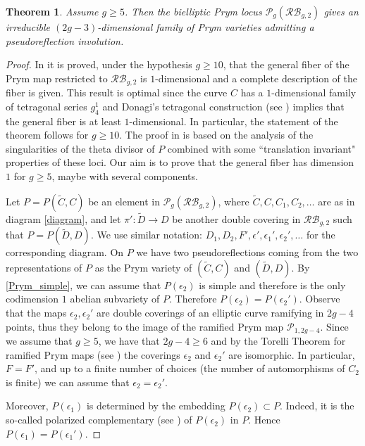 \documentclass[preprint,12pt]{amsart}
\def\cP{\ensuremath{\mathcal{P}}}
\def\tC{\ensuremath{\tilde{C}}}
\theoremstyle{plain}
\newtheorem{theorem}{Theorem}[section]
\theoremstyle{definition}
\begin{document}
\begin{theorem}\label{RBg2}
Assume $g\ge 5$. Then the bielliptic Prym locus $\cP_g(\mathcal {RB}_{g,2})$ gives an irreducible $(2g-3)$-dimensional family of Prym varieties admitting a pseudoreflection involution.
\end{theorem} 
\begin{proof}
In \cite[Theorem~8.7]{N} it is proved, under the hypothesis $g\ge 10$, that the general fiber of the Prym map restricted to $\mathcal {RB}_{g,2}$ is $1$-dimensional and a complete description of the fiber is given.
This result is optimal since the curve $C$ has a $1$-dimensional family of tetragonal series $g^1_4$ and Donagi's tetragonal construction (see \cite{do_fibres}) implies that the general fiber is at least $1$-dimensional.
In particular, the statement of the theorem follows for $g\ge 10$.
The proof in \cite{N} is based on the analysis of the singularities of the theta divisor of $P$ combined with some ``translation invariant" properties of these loci.
Our aim is to prove that the general fiber has dimension $1$ for $g\ge 5$, maybe with several components.

Let $P=P(\tC,C)$ be an element in $\cP_g(\mathcal {RB}_{g,2})$, where $\tC, C, C_1, C_2,\ldots$ are as in diagram \eqref{diagram}, and let $\pi ' \colon \widetilde D \rightarrow D$ be another double covering in $\mathcal {RB}_{g,2}$ such that $P=P(\widetilde D,D)$. 
We use similar notation: $D_1, D_2, F', \epsilon', \epsilon_1 ', \epsilon_2' ,\ldots$ for the corresponding diagram.
On $P$ we have two pseudoreflections coming from the two representations of $P$ as the Prym variety of $(\tC,C)$ and $(\widetilde D,D)$.
By \autoref{Prym_simple}, we can assume that $P(\epsilon_2)$ is simple and therefore is the only codimension $1$ abelian subvariety of $P$. Therefore $P(\epsilon_2)=P(\epsilon_2')$. 
Observe that the maps $\epsilon_2, \epsilon_2'$ are double coverings of an elliptic curve ramifying in $2g-4$ points, thus they belong to the image of the ramified Prym map $\cP_{1, 2g-4}$.
Since we assume that $g\ge 5$, we have that $2g-4\ge 6$ and by the Torelli Theorem for ramified Prym maps (see \cite{NO}) the coverings $\epsilon_2$ and $\epsilon_2'$ are isomorphic.
In particular, $F=F'$, and up to a finite number of choices (the number of automorphisms of $C_2$ is finite) we can assume that $\epsilon _2=\epsilon_2'$.

Moreover, $P(\epsilon_1)$ is determined by the embedding $P(\epsilon_2)\subset P$. Indeed, it is the so-called polarized complementary (see \cite[Section~ 5.3]{bl}) of $P(\epsilon_2)$ in $P$. Hence $P(\epsilon_1)=P(\epsilon_1')$.


\end{proof}
\end{document}
